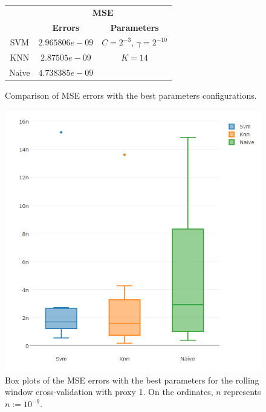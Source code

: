 \begin{figure}[!h]
\centering
\begin{tabular}{|c|c|c|}
   \hline
   & \multicolumn{2}{|c|}{\textbf{MSE}} \\ \cline{2-3}
   & \textbf{Errors} & \textbf{Parameters}          \\ \hline
   SVM  & $2.965806e-09$  & $C = 2^{-3}$, $\gamma = 2^{-10}$ \\ 
   KNN & $2.87505e-09$ & $K = 14 $ \\ 
   Naive & $4.738385e-09$  &      \\ 
   \hline
   \end{tabular}
\caption{Comparison of MSE errors with the best parameters configurations.}
\label{fig:table10yMSEp1}
\centering
\includegraphics[width=\linewidth]{img/10yproxy1MSE.png}
\caption{Box plots of the MSE errors with the best parameters for the rolling window cross-validation with proxy 1. On the ordinates, $n$ represents $n := 10^{-9}$.}\label{fig:table10yMSEp1a}
\end{figure}


